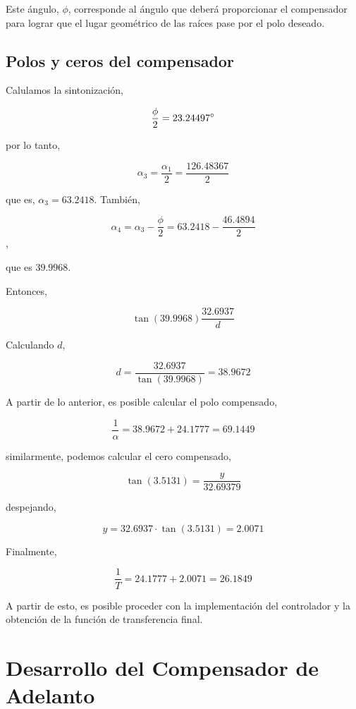 \documentclass[12pt,a4paper]{article}
\begin{document}
        Este ángulo, \( \phi \), corresponde al ángulo que deberá proporcionar el compensador para lograr que 
        el lugar geométrico de las raíces pase por el polo deseado. 

      \subsection{Polos y ceros del compensador}
        \label{subsec:polezero}

        Calulamos la sintonización, 

        \[ \dfrac{\phi}{2} = 23.24497\degree \]

        por lo tanto, 

        \[ \alpha_{3} = \dfrac{\alpha_{1}}{2} = \dfrac{126.48367}{2}  \]

        que es, \( \alpha_{3} = 63.2418 \). También, 

        \[ \alpha_{4} = \alpha_{3} - \dfrac{\phi}{2} = 63.2418 - \dfrac{46.4894}{2} \], 
        
        que es \( 39.9968 \). 

        Entonces, 

        \[ \tan\left(39.9968\right)\dfrac{32.6937}{d} \]

        Calculando \( d \), 

        \[ d = \dfrac{32.6937}{\tan\left(39.9968\right)} = 38.9672 \]

        A partir de lo anterior, es posible calcular el polo compensado, 
        
        \[ \dfrac{1}{\alpha } = 38.9672 + 24.1777 = 69.1449 \]

        similarmente, podemos calcular el cero compensado, 

        \[ \tan\left(3.5131 \right) = \dfrac{y}{32.69379} \]

        despejando, 

        \[ y = 32.6937 \cdot \tan\left(3.5131\right) = 2.0071 \]

        Finalmente, 

        \[ \dfrac{1}{T} = 24.1777 + 2.0071 = 26.1849\]

        A partir de esto, es posible proceder con la implementación del controlador y la obtención de la función 
        de transferencia final. 

	\pagebreak
	
	\section{Desarrollo del Compensador de Adelanto}
	
\end{document}
